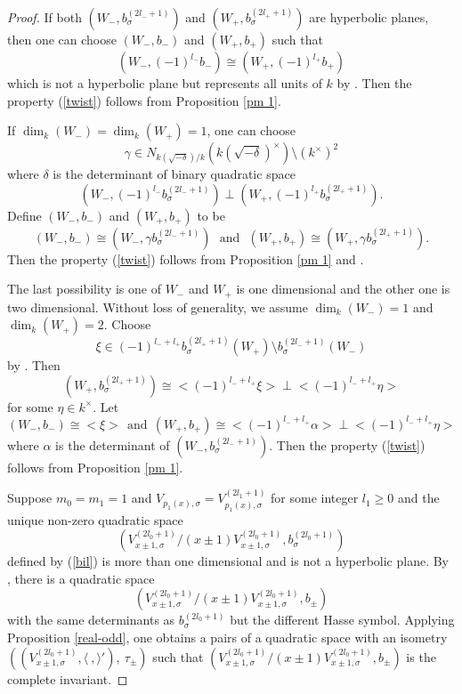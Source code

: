 \documentclass[12pt]{amsart}
\begin{document}
\begin{proof}
 If both $(W_-, b_{\sigma}^{(2l_-+1)})$ and $(W_+, b_{\sigma}^{(2l_++1)})$ are hyperbolic planes, then one can choose $(W_-, b_-)$ and 
 $(W_+, b_+)$ such that 
 $$(W_-, (-1)^{l_-}b_-) \cong (W_+, (-1)^{l_+} b_+ )$$ which is not a hyperbolic plane but represents all units of $k$ by \cite[63:15. Example (i)]{OM}.  Then the property (\ref{twist}) follows from Proposition \ref{pm 1}. 
 
 If $\dim_k (W_-)=\dim_k (W_{+})=1$, one can choose $$\gamma\in N_{k(\sqrt{-\delta})/k}(k(\sqrt{-\delta})^\times)\setminus (k^\times)^2$$
 where $\delta$ is the determinant of binary quadratic space $$(W_-, (-1)^{l_-}b_\sigma^{(2l_-+1)}) \perp (W_+, (-1)^{l_+}  b_{\sigma}^{(2l_++1)}) .$$ Define $(W_-, b_-)$ and $(W_+, b_+)$ to be
 $$ (W_-, b_-) \cong (W_-, \gamma b_\sigma^{(2l_-+1)}) \ \ \ \text{and} \ \ \ (W_+, b_+) \cong (W_+,  \gamma b_{\sigma}^{(2l_++1)}) .$$
 Then the property (\ref{twist}) follows from Proposition \ref{pm 1} and \cite[63:15. Example (iii)]{OM}. 
 
 The last possibility is one of $W_-$ and $W_+$ is one dimensional and the other one is two dimensional. Without loss of generality, we assume $\dim_k(W_-)=1$ and $\dim_k(W_+)=2$. 
Choose $$ \xi\in (-1)^{l_-+l_+} b_{\sigma}^{(2l_++1)}(W_+) \setminus b_\sigma^{(2l_-+1)}(W_-) $$ by \cite[63:15. Example (ii)]{OM}. Then $$(W_+, b_{\sigma}^{(2l_++1)})\cong <(-1)^{l_-+l_+} \xi> \perp <(-1)^{l_-+l_+} \eta >$$ for some $\eta\in k^\times$. Let 
$$(W_-, b_-) \cong <\xi >  \ \ \text{and}  \ \ (W_+, b_+) \cong <(-1)^{l_-+l_+} \alpha> \perp <(-1)^{l_-+l_+} \eta > $$
where $\alpha$ is the determinant of $(W_-, b_\sigma^{(2l_-+1)})$. Then the property (\ref{twist}) follows from Proposition \ref{pm 1}. 

\medskip

Suppose $m_0=m_1=1$ and $V_{p_1(x), \sigma}=V_{p_1(x), \sigma}^{(2l_1+1)}$ for some integer $l_1\geq 0$ and the unique non-zero quadratic space $$(V_{x\pm 1, \sigma}^{(2l_0+1)}/(x\pm 1)V_{x\pm 1, \sigma}^{(2l_0+1)} , b_\sigma^{(2l_0+1)})$$ defined by (\ref{bil}) is more than one dimensional and is not a hyperbolic plane. By \cite[63:22.  Theorem]{OM}, there is a quadratic space $$(V_{x\pm 1, \sigma}^{(2l_0+1)}/(x\pm 1)V_{x\pm 1, \sigma}^{(2l_0+1)} , b_{\pm})$$ with the same determinants as $b_{\sigma}^{(2l_0+1)}$  but the different Hasse symbol. Applying Proposition \ref{real-odd},  one obtains a pairs of a quadratic space with an isometry 
  $((V_{x\pm 1, \sigma}^{(2l_0+1)} , \langle \ , \rangle '), \  \tau_\pm) $ 
 such that $(V_{x\pm 1, \sigma}^{(2l_0+1)}/(x\pm 1)V_{x\pm 1, \sigma}^{(2l_0+1)} , b_{\pm})$ is the complete invariant.
 

\end{proof}
\end{document}
